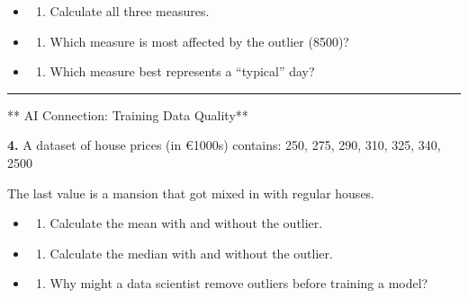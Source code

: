 \documentclass[
  11pt,
]{article}
\providecommand{\tightlist}{%
  \setlength{\itemsep}{0pt}\setlength{\parskip}{0pt}}
\begin{document}
\begin{itemize}
\item
  \begin{enumerate}
  \def\labelenumi{(\alph{enumi})}
  \tightlist
  \item
    Calculate all three measures.
  \end{enumerate}
\item
  \begin{enumerate}
  \def\labelenumi{(\alph{enumi})}
  \setcounter{enumi}{1}
  \tightlist
  \item
    Which measure is most affected by the outlier (8500)?
  \end{enumerate}
\item
  \begin{enumerate}
  \def\labelenumi{(\alph{enumi})}
  \setcounter{enumi}{2}
  \tightlist
  \item
    Which measure best represents a ``typical'' day?
  \end{enumerate}
\end{itemize}

\begin{center}\rule{0.5\linewidth}{0.5pt}\end{center}

** AI Connection: Training Data Quality**

\textbf{4.} A dataset of house prices (in €1000s) contains: 250, 275,
290, 310, 325, 340, 2500

The last value is a mansion that got mixed in with regular houses.

\begin{itemize}
\item
  \begin{enumerate}
  \def\labelenumi{(\alph{enumi})}
  \tightlist
  \item
    Calculate the mean with and without the outlier.
  \end{enumerate}
\item
  \begin{enumerate}
  \def\labelenumi{(\alph{enumi})}
  \setcounter{enumi}{1}
  \tightlist
  \item
    Calculate the median with and without the outlier.
  \end{enumerate}
\item
  \begin{enumerate}
  \def\labelenumi{(\alph{enumi})}
  \setcounter{enumi}{2}
  \tightlist
  \item
    Why might a data scientist remove outliers before training a model?
  \end{enumerate}
\end{itemize}
\end{document}
